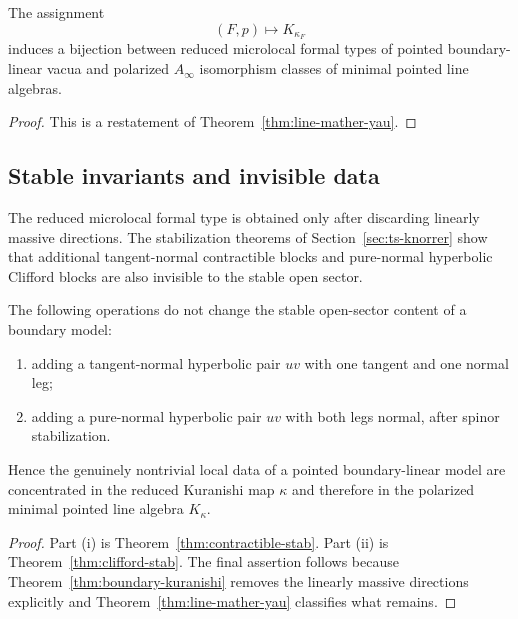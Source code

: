 \begin{corollary}\label{cor:microlocal-classification}
The assignment
\[
(F,p)\longmapsto K_{\kappa_F}
\]
induces a bijection between reduced microlocal formal types of pointed boundary-linear vacua and polarized $A_\infty$ isomorphism classes of minimal pointed line algebras.
\end{corollary}

\begin{proof}
This is a restatement of Theorem~\ref{thm:line-mather-yau}.
\end{proof}

\subsection{Stable invariants and invisible data}

The reduced microlocal formal type is obtained only after discarding linearly massive directions. The stabilization theorems of Section~\ref{sec:ts-knorrer} show that additional tangent-normal contractible blocks and pure-normal hyperbolic Clifford blocks are also invisible to the stable open sector.

\begin{corollary}\label{cor:stable-invisibility}
The following operations do not change the stable open-sector content of a boundary model:
\begin{enumerate}[label=(\roman*),leftmargin=1.8em]
\item adding a tangent-normal hyperbolic pair $u v$ with one tangent and one normal leg;
\item adding a pure-normal hyperbolic pair $uv$ with both legs normal, after spinor stabilization.
\end{enumerate}
Hence the genuinely nontrivial local data of a pointed boundary-linear model are concentrated in the reduced Kuranishi map $\kappa$ and therefore in the polarized minimal pointed line algebra $K_\kappa$.
\end{corollary}

\begin{proof}
Part (i) is Theorem~\ref{thm:contractible-stab}. Part (ii) is Theorem~\ref{thm:clifford-stab}. The final assertion follows because Theorem~\ref{thm:boundary-kuranishi} removes the linearly massive directions explicitly and Theorem~\ref{thm:line-mather-yau} classifies what remains.
\end{proof}

